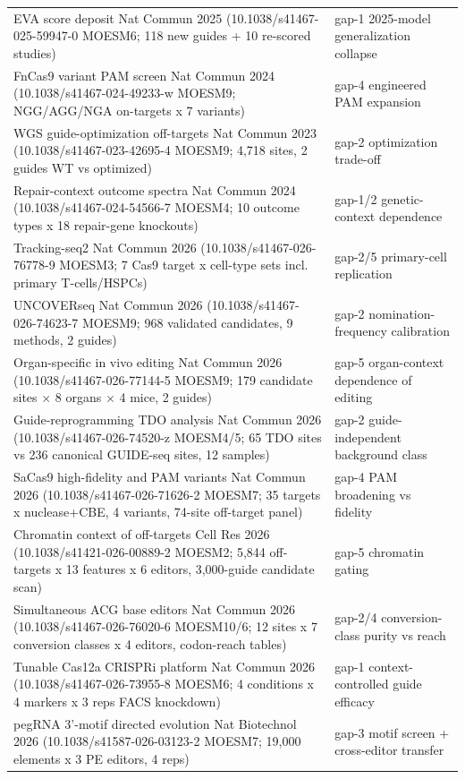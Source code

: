 \begin{longtable}{@{}p{}p{}@{}}
EVA score deposit Nat Commun 2025 (10.1038/s41467-025-59947-0 MOESM6; 118 new guides + 10 re-scored studies) & gap-1 2025-model generalization collapse \\
FnCas9 variant PAM screen Nat Commun 2024 (10.1038/s41467-024-49233-w MOESM9; NGG/AGG/NGA on-targets x 7 variants) & gap-4 engineered PAM expansion \\
WGS guide-optimization off-targets Nat Commun 2023 (10.1038/s41467-023-42695-4 MOESM9; 4,718 sites, 2 guides WT vs optimized) & gap-2 optimization trade-off \\
Repair-context outcome spectra Nat Commun 2024 (10.1038/s41467-024-54566-7 MOESM4; 10 outcome types x 18 repair-gene knockouts) & gap-1/2 genetic-context dependence \\
Tracking-seq2 Nat Commun 2026 (10.1038/s41467-026-76778-9 MOESM3; 7 Cas9 target x cell-type sets incl. primary T-cells/HSPCs) & gap-2/5 primary-cell replication \\
UNCOVERseq Nat Commun 2026 (10.1038/s41467-026-74623-7 MOESM9; 968 validated candidates, 9 methods, 2 guides) & gap-2 nomination-frequency calibration \\
Organ-specific in vivo editing Nat Commun 2026 (10.1038/s41467-026-77144-5 MOESM9; 179 candidate sites $\times$ 8 organs $\times$ 4 mice, 2 guides) & gap-5 organ-context dependence of editing \\
Guide-reprogramming TDO analysis Nat Commun 2026 (10.1038/s41467-026-74520-z MOESM4/5; 65 TDO sites vs 236 canonical GUIDE-seq sites, 12 samples) & gap-2 guide-independent background class \\
SaCas9 high-fidelity and PAM variants Nat Commun 2026 (10.1038/s41467-026-71626-2 MOESM7; 35 targets x nuclease+CBE, 4 variants, 74-site off-target panel) & gap-4 PAM broadening vs fidelity \\
Chromatin context of off-targets Cell Res 2026 (10.1038/s41421-026-00889-2 MOESM2; 5,844 off-targets x 13 features x 6 editors, 3,000-guide candidate scan) & gap-5 chromatin gating \\
Simultaneous ACG base editors Nat Commun 2026 (10.1038/s41467-026-76020-6 MOESM10/6; 12 sites x 7 conversion classes x 4 editors, codon-reach tables) & gap-2/4 conversion-class purity vs reach \\
Tunable Cas12a CRISPRi platform Nat Commun 2026 (10.1038/s41467-026-73955-8 MOESM6; 4 conditions x 4 markers x 3 reps FACS knockdown) & gap-1 context-controlled guide efficacy \\
pegRNA 3'-motif directed evolution Nat Biotechnol 2026 (10.1038/s41587-026-03123-2 MOESM7; 19,000 elements x 3 PE editors, 4 reps) & gap-3 motif screen + cross-editor transfer \\

\end{longtable}
